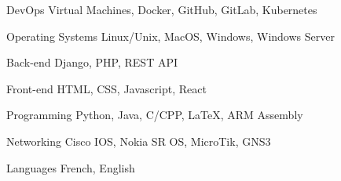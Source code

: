 

\begin{cvskills}

  \cvskill
    {DevOps} %
    {Virtual Machines, Docker, GitHub, GitLab, Kubernetes} %

  \cvskill
    {Operating Systems} %
    {Linux/Unix, MacOS, Windows, Windows Server} %

  \cvskill
    {Back-end} %
    {Django, PHP, REST API} %

  \cvskill
    {Front-end} %
    {HTML, CSS, Javascript, React} %

  \cvskill
    {Programming} %
    {Python, Java, C/CPP, LaTeX, ARM Assembly} %

  \cvskill
    {Networking} %
    {Cisco IOS, Nokia SR OS, MicroTik, GNS3} %

  \cvskill
    {Languages} %
    {French, English} %

\end{cvskills}
